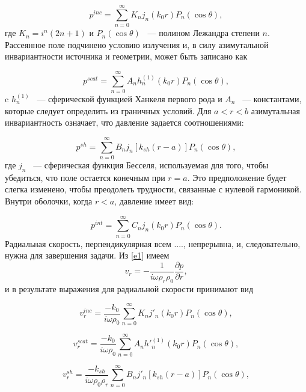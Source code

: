 \documentclass[a4paper, 12pt]{article}
\begin{document}
 \begin{equation}
 	p^{inc} = \sum\limits_{n=0}^{\infty}{K_nj_n(k_0r)P_n(\cos\theta)},
 \end{equation}
 где $K_n=i^n(2n+1)$ и $P_n(\cos\theta)$ ~--- полином Лежандра степени $n$.
 Рассеянное поле подчинено условию излучения и, в силу азимутальной инвариантности
 источника и геометрии, может быть записано как

 \begin{equation}
 	p^{scat} = \sum\limits_{n=0}^\infty{A_n h_n^{(1)}}(k_0r)P_n(\cos\theta),
 \end{equation}
 c $h_n^{(1)}$ ~--- сферической функцией Ханкеля первого рода и $A_n$ ~--- 
 константами, которые следует определить из граничных условий. 
 Для $a<r<b$ азимутальная инвариантность означает, что давление задается
 соотношениями:

 \begin{equation}
 	p^{sh} = \sum\limits_{n=0}^\infty{B_nj_n[k_{sh}(r-a)]P_n(\cos\theta)},
 \end{equation}
 где $j_n$ ~--- сферическая функция Бесселя, используемая для того, чтобы 
 убедиться, что поле остается конечным при $r=a$. Это предположение будет
 слегка изменено, чтобы преодолеть трудности, связанные с нулевой гармоникой.
 Внутри оболочки, когда $r<a$, давление имеет вид:

 \begin{equation}
 	p^{int} = \sum_{n=0}^\infty{C_nj_n(k_0r)P_n(\cos\theta)}.
 \end{equation}
 Радиальная скорость, перпендикулярная всем ....,  непрерывна, и, следовательно,
 нужна для завершения задачи. Из \eqref{e1} имеем
 \begin{equation}
 	v_r = - \frac{1}{i\omega\rho_r\rho_0} \frac{\partial p}{\partial r},
 \end{equation}
 и в результате выражения для радиальной скорости принимают вид 
 
 \begin{equation}
 	v_r^{inc} = \frac{-k_0}{i\omega\rho_0}
 		\sum_{n=0}^\infty{K_nj'_n(k_0r)P_n(\cos\theta)},
 \end{equation}

 \begin{equation}
  	v_r^{scat} = \frac{-k_0}{i\omega\rho_0}
 		\sum_{n=0}^\infty{A_n{h'}_n^{(1)}(k_0r)P_n(\cos\theta)},	
 \end{equation}

 \begin{equation}
 	 	v_r^{sh} = \frac{-k_{sh}}{i\omega\rho_0\rho_r}
 		\sum_{n=0}^\infty{B_nj'_n[k_{sh}(r-a)]P_n(\cos\theta)},
 \end{equation}
\end{document}
